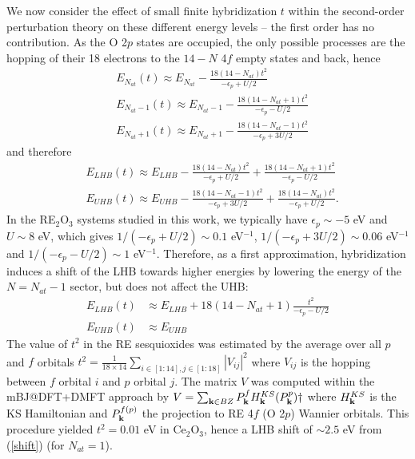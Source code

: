 \documentclass[aps,prb,twocolumn,amsmath,amssymb]{revtex4}
\begin{document}
We now consider the effect of small finite hybridization $t$ within the second-order perturbation theory on these different energy levels -- the first order has no contribution. As the O 2$p$ states are occupied, the only possible processes are the hopping of their 18 electrons to the $14-N$ 4$f$ empty states and back, hence
\begin{align*}
    & E_{N_{at}}(t)\approx E_{N_{at}} -\frac{18(14-N_{at})t^{2}}{-\epsilon_{p}+U/2}\\
   & E_{N_{at}-1}(t)\approx E_{N_{at}-1}-\frac{18(14-N_{at}+1)t^{2}}{-\epsilon_{p}-U/2}\\
&    E_{N_{at}+1}(t)\approx E_{N_{at}+1} -\frac{18(14-N_{at}-1)t^{2}}{-\epsilon_{p}+3U/2}
\end{align*}
and therefore 
\begin{align*}
    & E_{LHB}(t) \approx E_{LHB}-\frac{18(14-N_{at})t^{2}}{-\epsilon_{p}+U/2}+\frac{18(14-N_{at}+1)t^{2}}{-\epsilon_{p}-U/2}\\
    & E_{UHB}(t) \approx E_{UHB}-\frac{18(14-N_{at}-1)t^{2}}{-\epsilon_{p}+3U/2}+\frac{18(14-N_{at})t^{2}}{-\epsilon_{p}+U/2}.
\end{align*}
In the RE$_{2}$O$_{3}$ systems studied in this work, we typically have $\epsilon_{p}\sim -5$ eV and $U\sim 8$ eV, which gives $1/(-\epsilon_{p}+U/2)\sim 0.1$ eV$^{-1}$, $1/(-\epsilon_{p}+3U/2)\sim 0.06$ eV$^{-1}$ and $1/(-\epsilon_{p}-U/2)\sim 1$ eV$^{-1}$. Therefore, as a first approximation, hybridization induces a shift of the LHB  towards higher energies by lowering the energy of the $N=N_{at}-1$ sector, but does not affect the UHB:
\begin{align}
\label{shift}
    E_{LHB}(t)& \approx E_{LHB}+18(14-N_{at}+1)\frac{t^{2}}{-\epsilon_{p}-U/2}\\
    E_{UHB}(t)& \approx E_{UHB} \nonumber
\end{align}
The value of $t^{2}$ in the RE sesquioxides was estimated by the average over all $p$ and $f$ orbitals $t^{2}=\frac{1}{18\times14}\sum_{i\in [1:14], j \in [1:18]}|V_{ij}|^{2}$ where $V_{ij}$ is the hopping between $f$ orbital $i$ and $p$ orbital $j$. The matrix $V$ was computed within the mBJ@DFT+DMFT approach by $V=\sum_{\bold{k} \in BZ}P_{\bold{k}}^{f}H_{\bold{k}}^{KS}(P_\bold{k}^{p}){\dagger}$ where $H_{\bold{k}}^{KS}$ is the KS Hamiltonian and $P_{\bold{k}}^{f(p)}$ the projection to RE 4$f$ (O 2$p$) Wannier orbitals. This procedure yielded $t^{2}=0.01$ eV in Ce$_{2}$O$_{3}$, hence a LHB shift of $\sim 2.5$ eV from (\ref{shift}) (for $N_{at}=1$).
\end{document}
